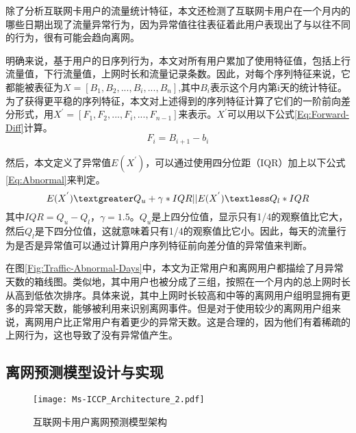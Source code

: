 除了分析互联网卡用户的流量统计特征，本文还检测了互联网卡用户在一个月内的哪些日期出现了流量异常行为，因为异常值往往表征着此用户表现出了与以往不同的行为，很有可能会趋向离网。\par
明确来说，基于用户的日序列行为，本文对所有用户累加了使用特征值，包括上行流量值，下行流量值，上网时长和流量记录条数。因此，对每个序列特征来说，它都能被表征为$X=[B_{1}, B_{2}, ..., B_{i}, ...,B_{n}]$,其中$B_{i}$表示这个月内第i天的统计特征。为了获得更平稳的序列特征，本文对上述得到的序列特征计算了它们的一阶前向差分形式，用$X^{'}=[F_{1}, F_{2}, ..., F_{i}, ...,F_{n-1}]$来表示。$X^{'}$可以用以下公式\eqref{Eq:Forward-Diff}计算。
\begin{equation}
	F_{i} = B_{i+1} - b_{i}
	\label{Eq:Forward-Diff}
\end{equation}
\par
然后，本文定义了异常值$E(X^{'})$，可以通过使用四分位距（IQR）加上以下公式\eqref{Eq:Abnormal}来判定。
\begin{equation}
	E(X^{'}) \textgreater Q_{u} + \gamma * IQR \lvert \rvert E(X^{'}) \textless Q_{l} * IQR
	\label{Eq:Abnormal}
\end{equation}
其中$IQR=Q_{u}-Q_{l}$，$\gamma = 1.5$。$Q_{u}$是上四分位值，显示只有1/4的观察值比它大，然后$Q_{l}$是下四分位值，这就意味着只有1/4的观察值比它小。因此，每天的流量行为是否是异常值可以通过计算用户序列特征前向差分值的异常值来判断。\par



在图\ref{Fig:Traffic-Abnormal-Days}中，本文为正常用户和离网用户都描绘了月异常天数的箱线图。类似地，其中用户也被分成了三组，按照在一个月内的总上网时长从高到低依次排序。具体来说，其中上网时长较高和中等的离网用户组明显拥有更多的异常天数，能够被利用来识别离网事件。但是对于使用较少的离网用户组来说，离网用户比正常用户有着更少的异常天数。这是合理的，因为他们有着稀疏的上网行为，这也导致了没有异常值产生。



\subsection{离网预测模型设计与实现}
\begin{figure}[!hbt]
	\centering
	\texttt{[image: Ms-ICCP\_Architecture\_2.pdf]}
	\caption{互联网卡用户离网预测模型架构}
	\label{Fig:ICCP-Architecture}
\end{figure}


